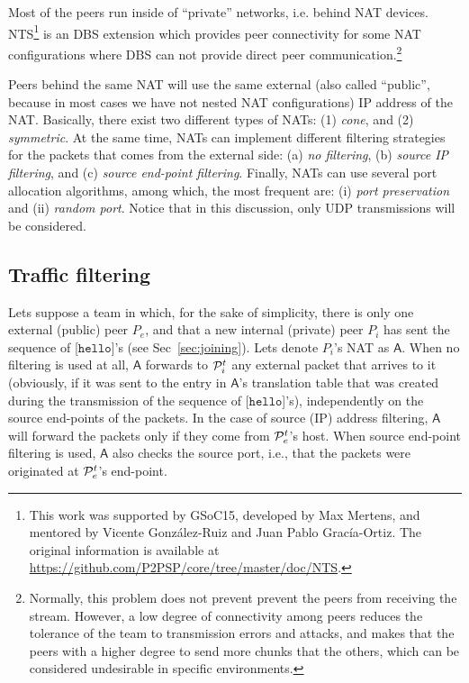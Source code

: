 
\label{sec:NTS}

Most of the peers run inside of ``private'' networks, i.e. behind NAT
devices. NTS\footnote{This work was supported by GSoC15, developed by
Max Mertens, and mentored by Vicente González-Ruiz and Juan Pablo
Gracía-Ortiz. The original information is available
at \url{https://github.com/P2PSP/core/tree/master/doc/NTS}.} is an DBS
extension which provides peer connectivity for some NAT configurations
where DBS can not provide direct peer
communication.\footnote{Normally, this problem does not prevent
prevent the peers from receiving the stream. However, a low degree of
connectivity among peers reduces the tolerance of the team to
transmission errors and attacks, and makes that the peers with a
higher degree to send more chunks that the others, which can be
considered undesirable in specific environments.}

Peers behind the same NAT will use the same external (also called
``public'', because in most cases we have not nested NAT
configurations) IP address of the NAT. Basically, there exist two
different types of NATs: (1) \emph{cone}, and (2) \emph{symmetric}. At
the same time, NATs can implement different filtering strategies for
the packets that comes from the external side: (a) \emph{no
  filtering}, (b) \emph{source IP filtering}, and (c) \emph{source
  end-point filtering}. Finally, NATs can use several port allocation
algorithms, among which, the most frequent are: (i) \emph{port
  preservation} and (ii) \emph{random port}. Notice that in this
discussion, only UDP transmissions will be considered.

\subsection{Traffic filtering}
Lets suppose a team in which, for the sake of simplicity, there is
only one external (public) peer $P_e$, and that a new internal
(private) peer $P_i$ has sent the sequence of [$\mathtt{hello}$]'s
(see Sec~\ref{sec:joining}). Lets denote $P_i$'s NAT as
$\mathsf{A}$. When no filtering is used at all, $\mathsf{A}$ forwards
to ${\cal P}^t_i$ any external packet that arrives to it (obviously,
if it was sent to the entry in $\mathsf{A}$'s translation table that
was created during the transmission of the sequence of
[$\mathtt{hello}$]'s), independently on the source end-points of the
packets. In the case of source (IP) address filtering, $\mathsf{A}$
will forward the packets only if they come from ${\cal P}^t_e$'s host.
When source end-point filtering is used, $\mathsf{A}$ also checks the
source port, i.e., that the packets were originated at ${\cal
  P}^t_e$'s end-point.

